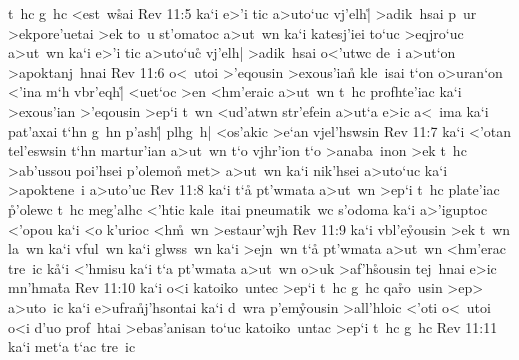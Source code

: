 t~hc
g~hc
<est~w\r{s}ai\bibvsend
{}
\vs Rev 11:5
ka`i
e>'i
tic
a>uto`uc
vj'elh|\r{}
>adik~hsai
p~ur
>ekpore'uetai
>ek
to~u
st'omatoc
a>ut~wn
ka`i
katesj'iei
to`uc
>eqjro`uc
a>ut~wn
ka`i
e>'i
tic
a>uto`uc\r{}
vj'elh|
>adik~hsai
o<'utwc
de~i
a>ut`on
>apoktanj~hnai\bibvsend
\vs Rev 11:6
o<~utoi
>'eqousin
>exous'ian\r{}
kle~isai
t`on
o>uran`on
<'ina
m`h
vbr'eqh|\r{}
<uet`oc
>en
<hm'eraic
a>ut~wn
t~hc
profhte'iac
ka`i
>exous'ian
>'eqousin
>ep`i
t~wn
<ud'atwn
str'efein
a>ut`a
e>ic
a<~ima
ka`i
pat'axai
t`hn
g~hn
p'ash|\r{}
plhg~h|
<os'akic
>e`an
vjel'hswsin\bibvsend
\vs Rev 11:7
ka`i
<'otan
tel'eswsin
t`hn
martur'ian
a>ut~wn
t`o
vjhr'ion
t`o
>anaba~inon
>ek
t~hc
>ab'ussou
poi'hsei
p'olemon\r{}
met>
a>ut~wn
ka`i
nik'hsei
a>uto`uc
ka`i
>apoktene~i
a>uto'uc\bibvsend
\vs Rev 11:8
ka`i
t`a\r{}
pt'wmata
a>ut~wn
>ep`i
t~hc
plate'iac
\r{p}'olewc
t~hc
meg'alhc
<'htic
kale~itai
pneumatik~wc
s'odoma
ka`i
a>'iguptoc
<'opou
ka`i
<o
k'urioc
<h\r{m}~wn
>estaur'wjh\bibvsend
\vs Rev 11:9
ka`i
vbl'e\r{y}ousin
>ek
t~wn
la~wn
ka`i
vful~wn
ka`i
glwss~wn
ka`i
>ejn~wn
t`a\r{}
pt'wmata
a>ut~wn
<hm'erac
tre~ic
k\r{a}`i
<'hmisu
ka`i
t`a
pt'wmata
a>ut~wn
o>uk
>af'h\r{s}ousin
tej~hnai
e>ic
mn'hma\r{t}a\bibvsend
{}
\vs Rev 11:10
ka`i
o<i
katoiko~untec
>ep`i
t~hc
g~hc
qa\r{r}o~usin
>ep>
a>uto~ic
ka`i
e>ufra\r{n}j'hsontai
ka`i
d~wra
p'em\r{y}ousin
>all'hloic
<'oti
o<~utoi
o<i
d'uo
prof~htai
>ebas'anisan
to`uc
katoiko~untac
>ep`i
t~hc
g~hc\bibvsend
\vs Rev 11:11
ka`i
met`a
t`ac
tre~ic
